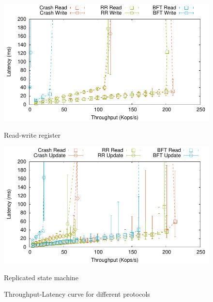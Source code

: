 \begin{figure}[th!]
    \centering
    \begin{minipage}[t]{0.45\linewidth}
        \includegraphics[width=\linewidth]{teem_results/protocol/1ms/reg-tput/result/reg}
        \caption{Read-write register}\label{fig:reg_tputlat}
    \end{minipage}
    \begin{minipage}[t]{0.45\linewidth}
        \includegraphics[width=\linewidth]{teem_results/protocol/1ms/smr-tput/result/smr}
        \caption{Replicated state machine}\label{fig:smr_tputlat}
    \end{minipage}
    \caption{Throughput-Latency curve for different protocols}
\end{figure}

